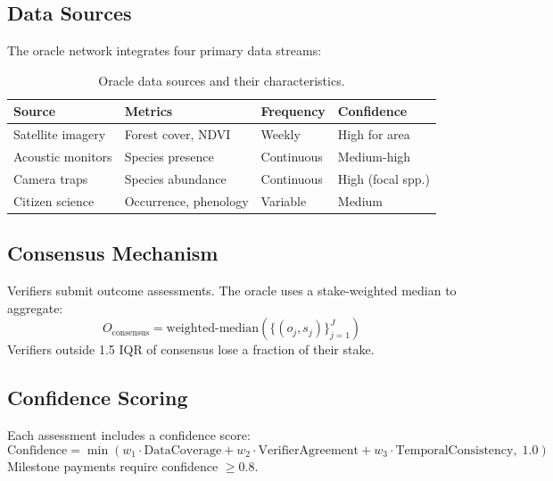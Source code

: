 \documentclass[11pt,a4paper]{article}
\begin{document}
\subsection{Data Sources}

The oracle network integrates four primary data streams:

\begin{table}[H]
\centering
\caption{Oracle data sources and their characteristics.}
\label{tab:oracle_sources}
\begin{tabular}{p{2.5cm}p{3cm}p{2cm}p{3cm}}
\toprule
\textbf{Source} & \textbf{Metrics} & \textbf{Frequency} &
  \textbf{Confidence} \\
\midrule
Satellite imagery & Forest cover, NDVI & Weekly & High for area \\
Acoustic monitors & Species presence & Continuous & Medium-high \\
Camera traps & Species abundance & Continuous & High (focal spp.) \\
Citizen science & Occurrence, phenology & Variable & Medium \\
\bottomrule
\end{tabular}
\end{table}

\subsection{Consensus Mechanism}

Verifiers submit outcome assessments. The oracle uses a stake-weighted
median to aggregate:
\begin{equation}
  O_{\text{consensus}} = \text{weighted-median}\!\left(
    \{(o_j, s_j)\}_{j=1}^{J}\right)
\end{equation}
Verifiers outside 1.5 IQR of consensus lose a fraction of their stake.

\subsection{Confidence Scoring}

Each assessment includes a confidence score:
\begin{equation}
  \text{Confidence} = \min\!\left(
    w_1 \cdot \text{DataCoverage} +
    w_2 \cdot \text{VerifierAgreement} +
    w_3 \cdot \text{TemporalConsistency},\; 1.0
  \right)
\end{equation}
Milestone payments require confidence $\geq 0.8$.


\end{document}
